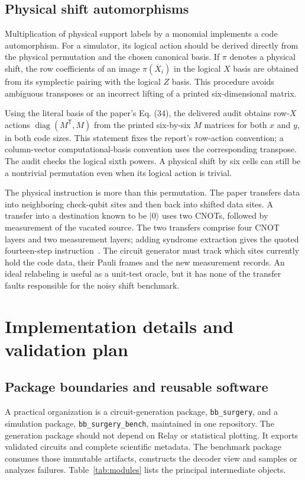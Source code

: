 \documentclass[11pt,a4paper]{article}
\newcommand{\lx}{\overline{X}}
\newcommand{\diag}{\operatorname{diag}}
\begin{document}
\subsection{Physical shift automorphisms}

Multiplication of physical support labels by a monomial implements a code automorphism. For a simulator, its logical action should be derived directly from the physical permutation and the chosen canonical basis. If $\pi$ denotes a physical shift, the row coefficients of an image $\pi(\lx_i)$ in the logical $X$ basis are obtained from its symplectic pairing with the logical $Z$ basis. This procedure avoids ambiguous transposes or an incorrect lifting of a printed six-dimensional matrix.

Using the literal basis of the paper's Eq. (34), the delivered audit obtains row-$X$ actions $\diag(M^{\mathsf T},M)$ from the printed six-by-six $M$ matrices for both $x$ and $y$, in both code sizes. This statement fixes the report's row-action convention; a column-vector computational-basis convention uses the corresponding transpose. The audit checks the logical sixth powers. A physical shift by six cells can still be a nontrivial permutation even when its logical action is trivial.

The physical instruction is more than this permutation. The paper transfers data into neighboring check-qubit sites and then back into shifted data sites. A transfer into a destination known to be $\lvert0\rangle$ uses two CNOTs, followed by measurement of the vacated source. The two transfers comprise four CNOT layers and two measurement layers; adding syndrome extraction gives the quoted fourteen-step instruction~\cite{tdg}. The circuit generator must track which sites currently hold the code data, their Pauli frames and the new measurement records. An ideal relabeling is useful as a unit-test oracle, but it has none of the transfer faults responsible for the noisy shift benchmark.

\section{Implementation details and validation plan}
\label{sec:implementation}

\subsection{Package boundaries and reusable software}

A practical organization is a circuit-generation package, \texttt{bb\_surgery}, and a simulation package, \texttt{bb\_surgery\_bench}, maintained in one repository. The generation package should not depend on Relay or statistical plotting. It exports validated circuits and complete scientific metadata. The benchmark package consumes those immutable artifacts, constructs the decoder view and samples or analyzes failures. Table~\ref{tab:modules} lists the principal intermediate objects.
\end{document}
